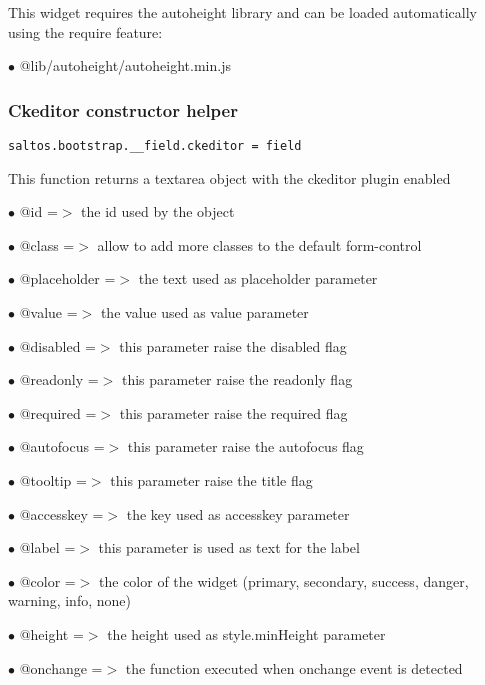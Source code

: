 \documentclass[a4paper]{article}
\begin{document}
This widget requires the autoheight library and can be loaded automatically using the require
feature:

\begin{compactitem}
\item[\color{myblue}$\bullet$] @lib/autoheight/autoheight.min.js
\end{compactitem}

\hypertarget{toc617}{}
\subsubsection{Ckeditor constructor helper}

\begin{lstlisting}
saltos.bootstrap.__field.ckeditor = field
\end{lstlisting}

This function returns a textarea object with the ckeditor plugin enabled

\begin{compactitem}
\item[\color{myblue}$\bullet$] @id          =$>$ the id used by the object
\item[\color{myblue}$\bullet$] @class       =$>$ allow to add more classes to the default form-control
\item[\color{myblue}$\bullet$] @placeholder =$>$ the text used as placeholder parameter
\item[\color{myblue}$\bullet$] @value       =$>$ the value used as value parameter
\item[\color{myblue}$\bullet$] @disabled    =$>$ this parameter raise the disabled flag
\item[\color{myblue}$\bullet$] @readonly    =$>$ this parameter raise the readonly flag
\item[\color{myblue}$\bullet$] @required    =$>$ this parameter raise the required flag
\item[\color{myblue}$\bullet$] @autofocus   =$>$ this parameter raise the autofocus flag
\item[\color{myblue}$\bullet$] @tooltip     =$>$ this parameter raise the title flag
\item[\color{myblue}$\bullet$] @accesskey   =$>$ the key used as accesskey parameter
\item[\color{myblue}$\bullet$] @label       =$>$ this parameter is used as text for the label
\item[\color{myblue}$\bullet$] @color       =$>$ the color of the widget (primary, secondary, success, danger, warning, info, none)
\item[\color{myblue}$\bullet$] @height      =$>$ the height used as style.minHeight parameter
\item[\color{myblue}$\bullet$] @onchange    =$>$ the function executed when onchange event is detected
\end{compactitem}
\end{document}

